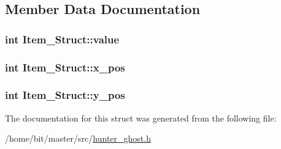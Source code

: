 \subsection{Member Data Documentation}
\hypertarget{structItem__Struct_ac0e3895647b53fea3e43aef68b044e42}{
\subsubsection[{value}]{\setlength{\rightskip}{0pt plus 5cm}int Item\-\_\-\-Struct\-::value}}\label{structItem__Struct_ac0e3895647b53fea3e43aef68b044e42}
\hypertarget{structItem__Struct_adcf51b98fbd8837636ba17f1d7a88e6a}{
\subsubsection[{x\-\_\-pos}]{\setlength{\rightskip}{0pt plus 5cm}int Item\-\_\-\-Struct\-::x\-\_\-pos}}\label{structItem__Struct_adcf51b98fbd8837636ba17f1d7a88e6a}
\hypertarget{structItem__Struct_a108413444c2b584ccf9e659820e68d40}{
\subsubsection[{y\-\_\-pos}]{\setlength{\rightskip}{0pt plus 5cm}int Item\-\_\-\-Struct\-::y\-\_\-pos}}\label{structItem__Struct_a108413444c2b584ccf9e659820e68d40}


The documentation for this struct was generated from the following file\-:\begin{DoxyCompactItemize}
\item 
/home/bit/master/src/\hyperlink{hunter__ghost_8h}{hunter\-\_\-ghost.\-h}\end{DoxyCompactItemize}
